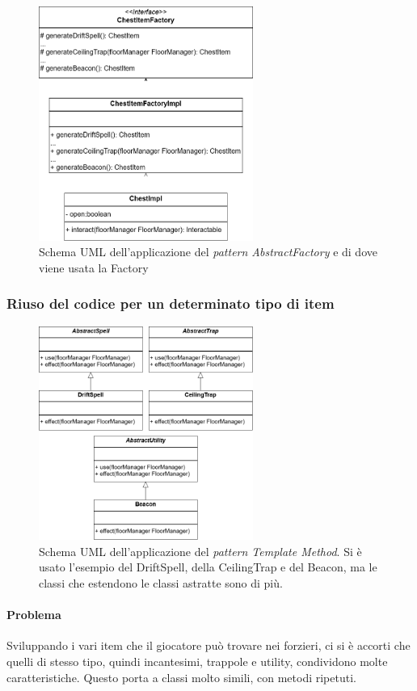 \documentclass{report}
\begin{document}
\begin{figure}[H]
    \centering
    \includegraphics[width=7cm]{patternFactory.drawio.png}
    \caption{Schema UML dell'applicazione del \textit{pattern AbstractFactory} e di dove viene usata la Factory}
    \label{img:chestItemFactory}
\end{figure}

\subsubsection{Riuso del codice per un determinato tipo di item}

\begin{figure}
    \centering
    \includegraphics[width=7cm]{patternTemplateItem.drawio.png}
    \caption{Schema UML dell'applicazione del \textit{pattern Template Method}. Si è usato l'esempio del DriftSpell, della CeilingTrap e del Beacon, ma le classi che estendono le classi astratte sono di più.}
    \label{img:templateItem}
\end{figure}

\paragraph{Problema} Sviluppando i vari item che il giocatore può trovare nei forzieri, ci si è accorti che quelli di stesso tipo, quindi incantesimi, trappole e utility, condividono molte caratteristiche.
%
Questo porta a classi molto simili, con metodi ripetuti. 
\end{document}
